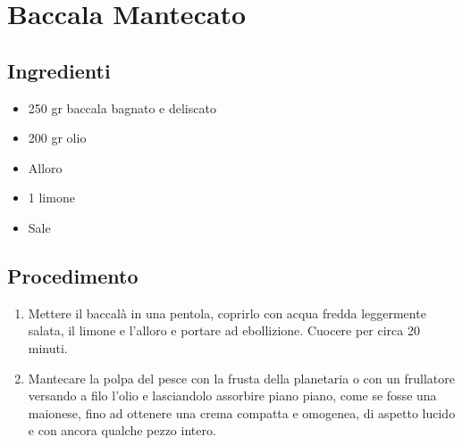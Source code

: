 \section{Baccala Mantecato}
\subsection{Ingredienti}
\begin{itemize}
\item 250 gr baccala bagnato e deliscato  
\item 200 gr olio  
\item Alloro  
\item 1 limone  
\item Sale
\end{itemize}
\subsection{Procedimento}
\begin{enumerate}
\item  Mettere il baccalà in una pentola, coprirlo con acqua fredda leggermente salata, il limone e l'alloro e portare ad ebollizione. Cuocere per circa 20 minuti.  
\item  Mantecare la polpa del pesce con la frusta della planetaria o con un frullatore versando a filo l'olio e lasciandolo assorbire piano piano, come se fosse una maionese, fino ad ottenere una crema compatta e omogenea, di aspetto lucido e con ancora qualche pezzo intero.
\end{enumerate}
